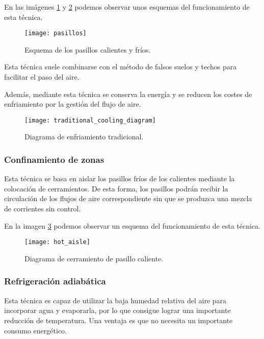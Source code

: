 En las imágenes \ref{pasillos} y \ref{traditional_cooling} podemos observar unos esquemas del funcionamiento de esta técnica.

\begin{figure}
    \begin{center}
    \caption{Esquema de los pasillos calientes y fríos.}
    \label{pasillos}
    \texttt{[image: pasillos]}
    \end{center}
\end{figure}

Esta técnica suele combinarse con el método de falsos suelos y techos para facilitar el paso del aire.

Además, mediante esta técnica se conserva la energía y se reducen los costes de enfriamiento por la gestión del flujo de aire.

\begin{figure}
    \begin{center}
    \caption{Diagrama de enfriamiento tradicional.}
    \label{traditional_cooling}
    \texttt{[image: traditional\_cooling\_diagram]}
    \end{center}
\end{figure}

\subsubsection{Confinamiento de zonas}

Esta técnica se basa en aislar los pasillos fríos de los calientes mediante la colocación de cerramientos. De esta forma, los pasillos podrán recibir la circulación de los flujos de aire correspondiente sin que se produzca una mezcla de corrientes sin control.

En la imagen \ref{hot_aisle} podemos observar un esquema del funcionamiento de esta técnica.

\begin{figure}
    \begin{center}
    \caption{Diagrama de cerramiento de pasillo caliente.}
    \label{hot_aisle}
    \texttt{[image: hot\_aisle]}
    \end{center}
\end{figure}

\subsubsection{Refrigeración adiabática}

Esta técnica es capaz de utilizar la baja humedad relativa del aire para incorporar agua y evaporarla, por lo que consigue lograr una importante reducción de temperatura. Una ventaja es que no necesita un importante consumo energético.

